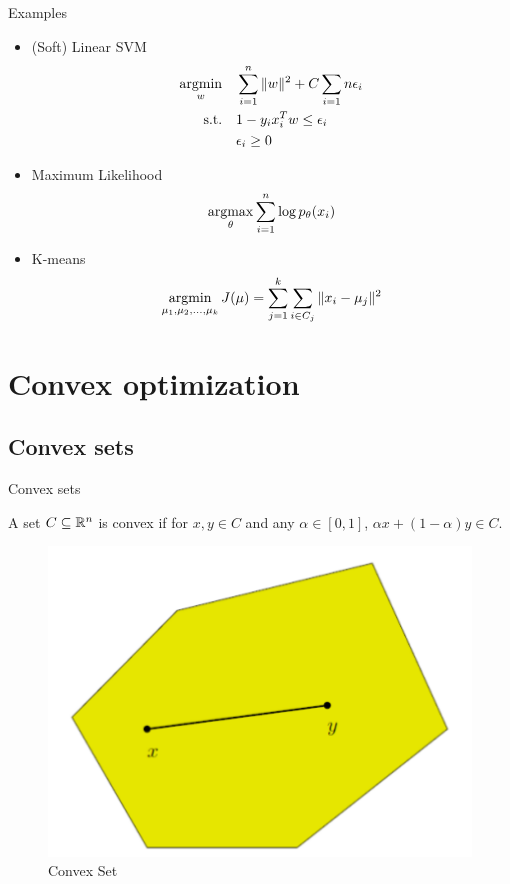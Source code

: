 \documentclass[notes]{beamer}
\begin{document}
\begin{frame}{Examples}
	\begin{itemize}
		\item (Soft) Linear SVM
		      \begin{equation}
			      \begin{aligned}
				      \mathop{\mathrm{argmin}}_w \quad     & \sum_{i=1}^{n} \|w\|^2 + C \sum_{i=1}{n} \epsilon_i \\
				      \textrm{s.t.} \quad & 1-y_ix_i^Tw\le \epsilon_i                           \\
				      \quad               & \epsilon_i \ge 0                                    \\
			      \end{aligned}
		      \end{equation}
		\item Maximum Likelihood
		      \begin{equation}
			      \mathop{\mathrm{argmax}}_\theta \sum_{i=1}^{n} \log p_\theta (x_i)
		      \end{equation}
		\item K-means
		      \begin{equation}
			      \mathop{\mathrm{argmin}}_{\mu_1,\mu_2,...,\mu_k} J(\mu) = \sum_{j=1}^{k} \sum_{i\in C_j} \|x_i-\mu_j\|^2
		      \end{equation}
	\end{itemize}
\end{frame}

\section{Convex optimization}
\subsection{Convex sets}

\begin{frame}{Convex sets}
	\begin{define}
		A set $C \subseteq {\mathbb{R}}^n$ is convex if for $x,y \in C$ and any $\alpha \in [0,1]$, $\alpha x +(1-\alpha)y \in C$.
	\end{define}
	\begin{figure}
		\includegraphics[width=.45\textwidth]{2018-03-04-21-52-01.png}
		\caption{Convex Set}
	\end{figure}

\end{frame}
\end{document}
